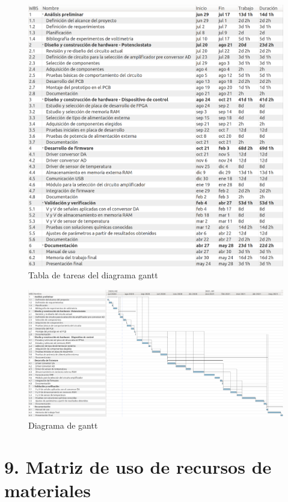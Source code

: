 \documentclass[11pt]{charter}
\begin{document}
\begin{figure}[H]
\centering 
\includegraphics[width=1\textwidth]{./Figuras/tabla_gantt.png}
\caption{Tabla de tareas del diagrama gantt}
\label{fig:gantt_tabla}
\end{figure}
\begin{landscape}
\begin{figure}[H]
\centering 
\includegraphics[width=1.6\textwidth]{./Figuras/gantt_full.png}
\caption{Diagrama de gantt}
\label{fig:gantt}
\end{figure}

\end{landscape}

\section{9. Matriz de uso de recursos de materiales}
\label{sec:recursos}
\end{document}
